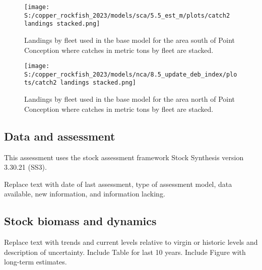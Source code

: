 \documentclass[11pt,
  english,
  letterpaper,
]{article}
\begin{document}




\begin{figure}
\centering
\texttt{[image: S:/copper\_rockfish\_2023/models/sca/5.5\_est\_m/plots/catch2 landings stacked.png]}
\caption{Landings by fleet used in the base model for the area south of Point Conception where catches in metric tons by fleet are stacked.\label{fig:es-south-catch}}
\end{figure}

\begin{figure}
\centering
\texttt{[image: S:/copper\_rockfish\_2023/models/nca/8.5\_update\_deb\_index/plots/catch2 landings stacked.png]}
\caption{Landings by fleet used in the base model for the area north of Point Conception where catches in metric tons by fleet are stacked.\label{fig:es-north-catch}}
\end{figure}

\hypertarget{data-and-assessment}{%
\subsection*{Data and assessment}\label{data-and-assessment}}

This assessment uses the stock assessment framework Stock Synthesis version 3.30.21 (SS3).

Replace text with date of last assessment, type of assessment model, data available, new information, and information lacking.

\hypertarget{stock-biomass-and-dynamics}{%
\subsection*{Stock biomass and dynamics}\label{stock-biomass-and-dynamics}}

Replace text with trends and current levels relative to virgin or historic levels and description of uncertainty. Include Table for last 10 years. Include Figure with long-term estimates.





\begingroup\fontsize{10}{12}\selectfont
\begingroup\fontsize{10}{12}\selectfont
\end{document}
